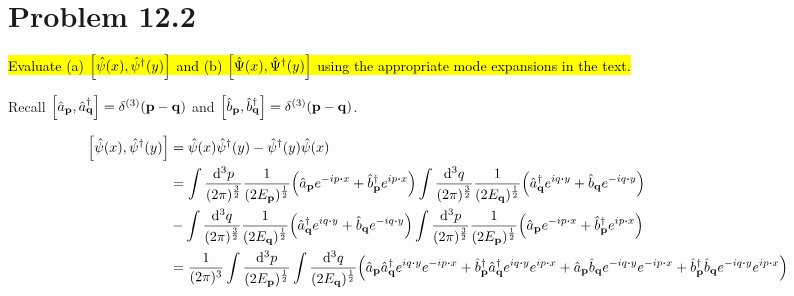 \documentclass{article}
\begin{document}
\section*{Problem 12.2}
\begin{quoting}
    \hl{Evaluate (a) $\bqty{\hat{\psi}(x),\hat{\psi}^\dagger (y)}$ and (b) $\bqty{\hat{\Psi}(x),\hat{\Psi}^\dagger (y)}$ using the appropriate mode expansions in the text.}
\end{quoting}

Recall $\bqty{\hat{a}_{\vb{p}},\hat{a}^\dagger_{\vb{q}}}=\delta^{(3)}(\vb{p}-\vb{q})$ and $\bqty{\hat{b}_{\vb{p}},\hat{b}^\dagger_{\vb{q}}}=\delta^{(3)}(\vb{p}-\vb{q})$.

\begin{align*}
    \bqty{\hat{\psi}(x),\hat{\psi}^\dagger (y)} & =\hat{\psi}(x)\hat{\psi}^\dagger(y) - \hat{\psi}^\dagger(y)\hat{\psi}(x)                                                                                                                                                                                                                                                                                                                                            \\
                                                & =\int \frac{\dd[3]{p}}{(2\pi)^\frac{3}{2}}  \frac{1}{(2E_{\vb{p}})^{\frac{1}{2}}}  \pqty{\hat{a}_{\vb{p}}e^{-ip\vdot x}+\hat{b}^\dagger_{\vb{p}}e^{ip\vdot x}}\int \frac{\dd[3]{q}}{(2\pi)^\frac{3}{2}}  \frac{1}{(2E_{\vb{q}})^{\frac{1}{2}}}\pqty{\hat{a}^\dagger_{\vb{q}}e^{iq\vdot y}+\hat{b}_{\vb{q}}e^{-iq\vdot y}}                                                                                           \\
                                                & -\int \frac{\dd[3]{q}}{(2\pi)^\frac{3}{2}}  \frac{1}{(2E_{\vb{q}})^{\frac{1}{2}}}\pqty{\hat{a}^\dagger_{\vb{q}}e^{iq\vdot y}+\hat{b}_{\vb{q}}e^{-iq\vdot y}}\int \frac{\dd[3]{p}}{(2\pi)^\frac{3}{2}}  \frac{1}{(2E_{\vb{p}})^{\frac{1}{2}}}  \pqty{\hat{a}_{\vb{p}}e^{-ip\vdot x}+\hat{b}^\dagger_{\vb{p}}e^{ip\vdot x}}                                                                                           \\
                                                & =\frac{1}{(2\pi)^3}\int\frac{\dd[3]{p}}{(2E_{\vb{p}})^{\frac{1}{2}}}\int   \frac{\dd[3]{q}}{(2E_{\vb{q}})^{\frac{1}{2}}}     \pqty{\hat{a}_{\vb{p}}\hat{a}^\dagger_{\vb{q}}e^{iq\vdot y}e^{-ip\vdot x}+\hat{b}^\dagger_{\vb{p}}\hat{a}^\dagger_{\vb{q}}e^{iq\vdot y}e^{ip\vdot x}+\hat{a}_{\vb{p}}\hat{b}_{\vb{q}}e^{-iq\vdot y}e^{-ip\vdot x}+\hat{b}^\dagger_{\vb{p}}\hat{b}_{\vb{q}}e^{-iq\vdot y}e^{ip\vdot x}} \\

\end{align*}
\end{document}
